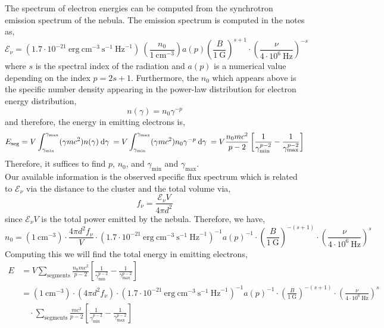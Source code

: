 \documentclass[12pt]{article}
\begin{document}
The spectrum of electron energies can be computed from the synchrotron emission spectrum of the nebula. The emission spectrum is computed in the notes as,
\[ \mathcal{E}_\nu = (1.7 \cdot 10^{-21} \: \mathrm{erg} \: \mathrm{cm}^{-3} \: \mathrm{s}^{-1} \: \mathrm{Hz}^{-1})  \: \left( \frac{n_0}{1 \: \mathrm{cm}^{-3}} \right) a(p) \left( \frac{B}{1 \: \mathrm{G}} \right)^{s + 1} \cdot \left( \frac{\nu}{4 \cdot 10^6 \: \mathrm{Hz}} \right)^{-s} \]
where $s$ is the spectral index of the radiation and $a(p)$ is a numerical value depending on the index $p = 2 s + 1$. Furthermore, the $n_0$ which appears above is the specific number density appearing in the power-law distribution for electron energy distribution,
\[ n(\gamma) = n_0 \gamma^{-p} \]
and therefore, the energy in emitting electrons is,
\[ E_{\text{seg}} = V \int_{\gamma_{\text{min}}}^{\gamma_{\text{max}}} (\gamma m c^2) n(\gamma) \: \mathrm{d}\gamma \: = V \int_{\gamma_{\text{min}}}^{\gamma_{\text{max}}} (\gamma m c^2) n_0 \gamma^{-p} \: \mathrm{d}\gamma \: = V \frac{n_0 m c^2}{p - 2} \left[ \frac{1}{\gamma_{\text{min}}^{p - 2}} - \frac{1}{\gamma_{\text{max}}^{p - 2}} \right] \]
Therefore, it suffices to find $p$, $n_0$, and $\gamma_{\text{min}}$ and $\gamma_{\text{max}}$. 
\bigskip\\
Our available information is the observed specific flux spectrum which is related to $\mathcal{E}_\nu$ via the distance to the cluster and the total volume via,
\[ f_{\nu} = \frac{\mathcal{E}_\nu V}{4 \pi d^2} \]
since $\mathcal{E}_\nu V$ is the total power emitted by the nebula. Therefore, we have,
\[ n_0 = (1 \: \mathrm{cm}^{-3}) \cdot \frac{4 \pi d^2 f_\nu}{V} \cdot (1.7 \cdot 10^{-21} \: \mathrm{erg} \: \mathrm{cm}^{-3} \: \mathrm{s}^{-1} \: \mathrm{Hz}^{-1})^{-1} a(p)^{-1} \cdot \left( \frac{B}{1 \: \mathrm{G}} \right)^{-(s + 1)} \cdot \left( \frac{\nu}{4 \cdot 10^6 \: \mathrm{Hz}} \right)^{s} \]
Computing this we will find the total energy in emitting electrons,
\begin{align*}
E & = V \sum_{\text{segments}} \frac{n_0 m c^2}{p - 2} \left[ \frac{1}{\gamma_{\text{min}}^{p - 2}} - \frac{1}{\gamma_{\text{max}}^{p - 2}} \right] 
\\
& = (1 \: \mathrm{cm}^{-3}) \cdot (4 \pi d^2 f_\nu) \cdot (1.7 \cdot 10^{-21} \: \mathrm{erg} \: \mathrm{cm}^{-3} \: \mathrm{s}^{-1} \: \mathrm{Hz}^{-1})^{-1} a(p)^{-1} \cdot \left( \frac{B}{1 \: \mathrm{G}} \right)^{-(s + 1)} \cdot \left( \frac{\nu}{4 \cdot 10^6 \: \mathrm{Hz}} \right)^{s} 
\\
& \quad \cdot \sum_{\text{segments}} \frac{m c^2}{p - 2} \left[ \frac{1}{\gamma_{\text{min}}^{p - 2}} - \frac{1}{\gamma_{\text{max}}^{p - 2}} \right] 
\end{align*} 
\end{document}
